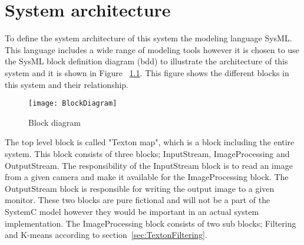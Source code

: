 \chapter{System architecture}

To define the system architecture of this system the modeling language SysML. This language includes a wide range of modeling tools however it is chosen to use the SysML block definition diagram (bdd) to illustrate the architecture of this system and it is shown in Figure ~\ref{fig:BlockDiagram}. This figure shows the different blocks in this system and their relationship. 

\begin{figure}[H]
\centering
\texttt{[image: BlockDiagram]}
\caption{Block diagram}
\label{fig:BlockDiagram}
\end{figure}

The top level block is called "Texton map", which is a block including the entire system. This block consists of three blocks; InputStream, ImageProcessing and OutputStream. The responsibility of the InputStream block is to read an image from a given camera and make it available for the ImageProcessing block. The OutputStream block is responsible for writing the output image to a given monitor. These two blocks are pure fictional and will not be a part of the SystemC model however they would be important in an actual system implementation. The ImageProcessing block consists of two sub blocks; Filtering and K-means according to section~\ref{sec:TextonFiltering}.